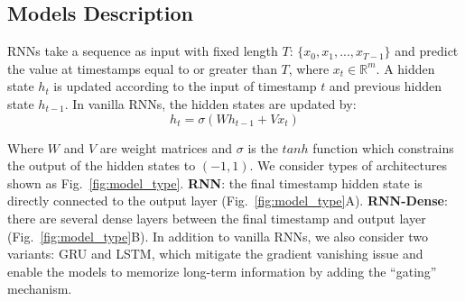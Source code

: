 \subsection{Models Description}
\label{section:model_description}
RNNs take a sequence as input with fixed length $T$: $\{x_0, x_1,..., x_{T-1}\}$ and predict the value at timestamps equal to or greater than $T$, where $x_{t} \in \mathbb R^{m}$. 
A hidden state $h_t$ is updated according to the input of timestamp $t$ and previous hidden state $h_{t-1}$.
In vanilla RNNs, the hidden states are updated by:
\begin{equation} 
h_t = \sigma(Wh_{t-1} + Vx_t)
\end{equation}

Where $W$ and $V$ are weight matrices and $\sigma$ is the $tanh$ function which constrains the output of the hidden states to $(-1, 1)$. We consider  types of architectures shown as Fig.~\ref{fig:model_type}. 
\textbf{RNN}: the final timestamp hidden state is directly connected to the output layer (Fig.~\ref{fig:model_type}A). \textbf{RNN-Dense}: there are several dense layers between the final timestamp and output layer (Fig.~\ref{fig:model_type}B). 
In addition to vanilla RNNs, we also consider two variants: GRU and LSTM, which mitigate the gradient vanishing issue and enable the models to memorize long-term information by adding the ``gating'' mechanism.

